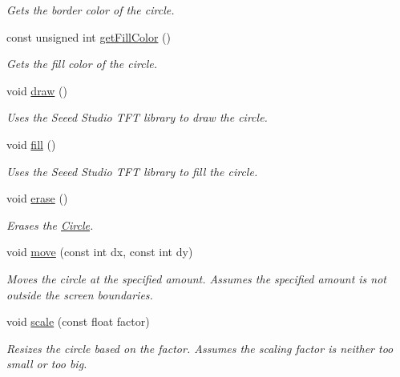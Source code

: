 \begin{DoxyCompactItemize}
\begin{DoxyCompactList}\small\item\em Gets the border color of the circle. \end{DoxyCompactList}\item 
const unsigned int \hyperlink{class_circle_a567e34480ed3af231bd019f66ab80fb7}{get\+Fill\+Color} ()
\begin{DoxyCompactList}\small\item\em Gets the fill color of the circle. \end{DoxyCompactList}\item 
\hypertarget{class_circle_a3a3f7166e7f629e44f9044b0e537eb22}{void \hyperlink{class_circle_a3a3f7166e7f629e44f9044b0e537eb22}{draw} ()}\label{class_circle_a3a3f7166e7f629e44f9044b0e537eb22}

\begin{DoxyCompactList}\small\item\em Uses the Seeed Studio T\+F\+T library to draw the circle. \end{DoxyCompactList}\item 
\hypertarget{class_circle_af69594749622c501d7a0c65715704e67}{void \hyperlink{class_circle_af69594749622c501d7a0c65715704e67}{fill} ()}\label{class_circle_af69594749622c501d7a0c65715704e67}

\begin{DoxyCompactList}\small\item\em Uses the Seeed Studio T\+F\+T library to fill the circle. \end{DoxyCompactList}\item 
\hypertarget{class_circle_a9a42b8ca047d6b297b86ae5e3cbdcc53}{void \hyperlink{class_circle_a9a42b8ca047d6b297b86ae5e3cbdcc53}{erase} ()}\label{class_circle_a9a42b8ca047d6b297b86ae5e3cbdcc53}

\begin{DoxyCompactList}\small\item\em Erases the \hyperlink{class_circle}{Circle}. \end{DoxyCompactList}\item 
void \hyperlink{class_circle_a73224ec141f6c58d1feff0a46a215b87}{move} (const int dx, const int dy)
\begin{DoxyCompactList}\small\item\em Moves the circle at the specified amount. Assumes the specified amount is not outside the screen boundaries. \end{DoxyCompactList}\item 
void \hyperlink{class_circle_ab02f952985bd988592c69409e2b5fe69}{scale} (const float factor)
\begin{DoxyCompactList}\small\item\em Resizes the circle based on the factor. Assumes the scaling factor is neither too small or too big. \end{DoxyCompactList}\end{DoxyCompactItemize}


